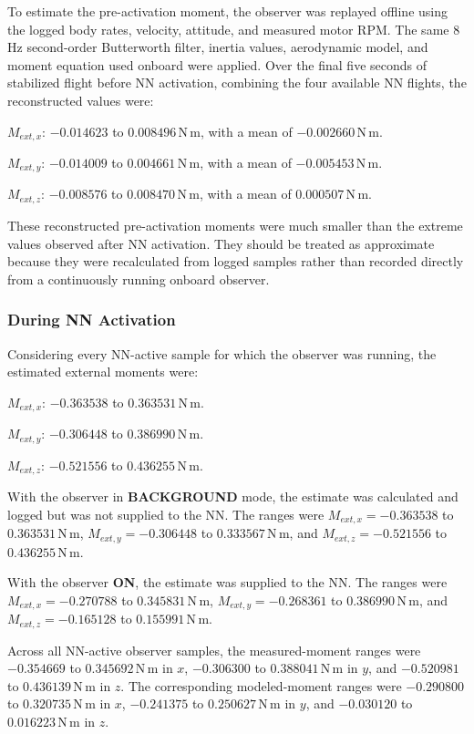\documentclass[11pt,a4paper]{article}
\newcommand{\Nm}{\,\mathrm{N\,m}}
\begin{document}
To estimate the pre-activation moment, the observer was replayed offline using the logged body rates, velocity, attitude, and measured motor RPM. The same 8\,Hz second-order Butterworth filter, inertia values, aerodynamic model, and moment equation used onboard were applied. Over the final five seconds of stabilized flight before NN activation, combining the four available NN flights, the reconstructed values were:

\noindent $M_{ext,x}$: $-0.014623$ to $0.008496\Nm$, with a mean of $-0.002660\Nm$.\par
\noindent $M_{ext,y}$: $-0.014009$ to $0.004661\Nm$, with a mean of $-0.005453\Nm$.\par
\noindent $M_{ext,z}$: $-0.008576$ to $0.008470\Nm$, with a mean of $0.000507\Nm$.

These reconstructed pre-activation moments were much smaller than the extreme values observed after NN activation. They should be treated as approximate because they were recalculated from logged samples rather than recorded directly from a continuously running onboard observer.

\subsubsection{During NN Activation}

Considering every NN-active sample for which the observer was running, the estimated external moments were:

\noindent $M_{ext,x}$: $-0.363538$ to $0.363531\Nm$.\par
\noindent $M_{ext,y}$: $-0.306448$ to $0.386990\Nm$.\par
\noindent $M_{ext,z}$: $-0.521556$ to $0.436255\Nm$.

With the observer in \textbf{BACKGROUND} mode, the estimate was calculated and logged but was not supplied to the NN. The ranges were $M_{ext,x}=-0.363538$ to $0.363531\Nm$, $M_{ext,y}=-0.306448$ to $0.333567\Nm$, and $M_{ext,z}=-0.521556$ to $0.436255\Nm$.

With the observer \textbf{ON}, the estimate was supplied to the NN. The ranges were $M_{ext,x}=-0.270788$ to $0.345831\Nm$, $M_{ext,y}=-0.268361$ to $0.386990\Nm$, and $M_{ext,z}=-0.165128$ to $0.155991\Nm$.

Across all NN-active observer samples, the measured-moment ranges were $-0.354669$ to $0.345692\Nm$ in $x$, $-0.306300$ to $0.388041\Nm$ in $y$, and $-0.520981$ to $0.436139\Nm$ in $z$. The corresponding modeled-moment ranges were $-0.290800$ to $0.320735\Nm$ in $x$, $-0.241375$ to $0.250627\Nm$ in $y$, and $-0.030120$ to $0.016223\Nm$ in $z$.
\end{document}
